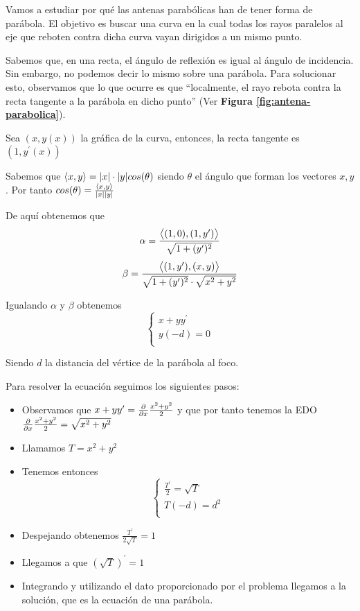 \documentclass{mathnotes}
\begin{document}
\begin{example}
Vamos a estudiar por qué las antenas parabólicas han de tener forma de parábola. El objetivo es buscar una curva en la cual todas los rayos paralelos al eje que reboten contra dicha curva vayan dirigidos a un mismo punto.

Sabemos que, en una recta, el ángulo de reflexión es igual al ángulo de incidencia. Sin embargo, no podemos decir lo mismo sobre una parábola. Para solucionar esto, observamos que lo que ocurre es que ``localmente, el rayo rebota contra la recta tangente a la parábola en dicho punto'' (Ver \textbf{Figura \ref{fig:antena-parabolica}}).

Sea $(x,y(x))$ la gráfica de la curva, entonces, la recta tangente es $(1, y^\prime(x))$

Sabemos que $\left\langle x,y\right\rangle=|x|\cdot|y|cos(\theta)$ siendo $\theta$ el ángulo que forman los vectores $x,y$. Por tanto $cos(\theta)=\frac{\left\langle x,y\right\rangle}{|x||y|}$

De aquí obtenemos que
$$\alpha = \frac{\left\langle (1,0),(1,y^\prime)\right\rangle}{\sqrt{1+(y^\prime)^2}}$$
$$\beta = \frac{\left\langle (1,y^\prime),(x,y)\right\rangle}{\sqrt{1+(y^\prime)^2}\cdot\sqrt{x^2+y^2}}$$

Igualando $\alpha$ y $\beta$ obtenemos
\begin{equation*}
  \left\lbrace
  \begin{array}{l}
     x+yy^\prime \\
     y(-d) = 0  \\
  \end{array}
  \right.
\end{equation*}

Siendo $d$ la distancia del vértice de la parábola al foco.

Para resolver la ecuación seguimos los siguientes pasos:
\begin{itemize}
\item Observamos que $x+yy^\prime = \frac{\partial}{\partial x}\frac{x^2+y^2}{2}$ y que por tanto tenemos la EDO $\frac{\partial}{\partial x}\frac{x^2+y^2}{2}=\sqrt{x^2+y^2}$
\item Llamamos $T=x^2+y^2$
\item Tenemos entonces
\begin{equation*}
  \left\lbrace
  \begin{array}{l}
     \frac{T^\prime}{2} = \sqrt{T} \\
     T(-d) = d^2  \\
  \end{array}
  \right.
\end{equation*}
\item Despejando obtenemos $\frac{T^\prime}{2\sqrt{T}} = 1$
\item Llegamos a que $(\sqrt{T})^\prime = 1$
\item Integrando y utilizando el dato proporcionado por el problema llegamos a la solución, que es la ecuación de una parábola.
\end{itemize}
\end{example}
\end{document}
